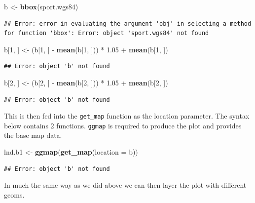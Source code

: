 \documentclass[]{article}
\newenvironment{Shaded}{}{}
\newcommand{\KeywordTok}[1]{\textcolor[rgb]{0.00,0.44,0.13}{\textbf{{#1}}}}
\newcommand{\DataTypeTok}[1]{\textcolor[rgb]{0.56,0.13,0.00}{{#1}}}
\newcommand{\DecValTok}[1]{\textcolor[rgb]{0.25,0.63,0.44}{{#1}}}
\newcommand{\FloatTok}[1]{\textcolor[rgb]{0.25,0.63,0.44}{{#1}}}
\newcommand{\CommentTok}[1]{\textcolor[rgb]{0.38,0.63,0.69}{\textit{{#1}}}}
\newcommand{\NormalTok}[1]{{#1}}
\begin{document}
\begin{Shaded}
\begin{Highlighting}[]
\NormalTok{b <- }\KeywordTok{bbox}\NormalTok{(sport.wgs84)}
\end{Highlighting}
\end{Shaded}
\begin{verbatim}
## Error: error in evaluating the argument 'obj' in selecting a method for function 'bbox': Error: object 'sport.wgs84' not found
\end{verbatim}
\begin{Shaded}
\begin{Highlighting}[]
\NormalTok{b[}\DecValTok{1}\NormalTok{, ] <- (b[}\DecValTok{1}\NormalTok{, ] - }\KeywordTok{mean}\NormalTok{(b[}\DecValTok{1}\NormalTok{, ])) * }\FloatTok{1.05} \NormalTok{+ }\KeywordTok{mean}\NormalTok{(b[}\DecValTok{1}\NormalTok{, ])}
\end{Highlighting}
\end{Shaded}
\begin{verbatim}
## Error: object 'b' not found
\end{verbatim}
\begin{Shaded}
\begin{Highlighting}[]
\NormalTok{b[}\DecValTok{2}\NormalTok{, ] <- (b[}\DecValTok{2}\NormalTok{, ] - }\KeywordTok{mean}\NormalTok{(b[}\DecValTok{2}\NormalTok{, ])) * }\FloatTok{1.05} \NormalTok{+ }\KeywordTok{mean}\NormalTok{(b[}\DecValTok{2}\NormalTok{, ])}
\end{Highlighting}
\end{Shaded}
\begin{verbatim}
## Error: object 'b' not found
\end{verbatim}
\begin{Shaded}
\end{Shaded}
This is then fed into the \texttt{get\_map} function as the location
parameter. The syntax below contains 2 functions. \texttt{ggmap} is
required to produce the plot and provides the base map data.

\begin{Shaded}
\begin{Highlighting}[]
\NormalTok{lnd.b1 <- }\KeywordTok{ggmap}\NormalTok{(}\KeywordTok{get_map}\NormalTok{(}\DataTypeTok{location =} \NormalTok{b))}
\end{Highlighting}
\end{Shaded}
\begin{verbatim}
## Error: object 'b' not found
\end{verbatim}
In much the same way as we did above we can then layer the plot with
different geoms.
\end{document}

